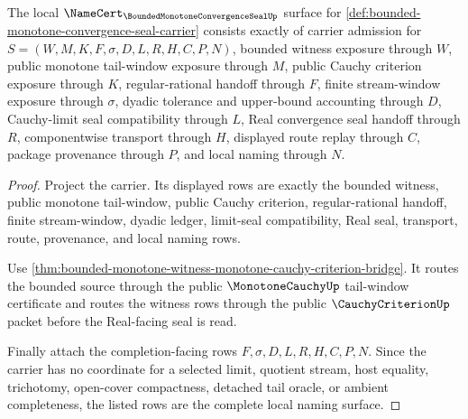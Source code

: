 \begin{theorem}
\label{thm:bounded-monotone-convergence-seal-namecert-obligations}
The local $\NameCert_{\BoundedMonotoneConvergenceSealUp}$ surface for \autoref{def:bounded-monotone-convergence-seal-carrier} consists exactly of carrier admission for $S=(W,M,K,F,\sigma,D,L,R,H,C,P,N)$, bounded witness exposure through $W$, public monotone tail-window exposure through $M$, public Cauchy criterion exposure through $K$, regular-rational handoff through $F$, finite stream-window exposure through $\sigma$, dyadic tolerance and upper-bound accounting through $D$, Cauchy-limit seal compatibility through $L$, Real convergence seal handoff through $R$, componentwise transport through $H$, displayed route replay through $C$, package provenance through $P$, and local naming through $N$.
\end{theorem}
\begin{proof}
Project the carrier. Its displayed rows are exactly the bounded witness, public monotone tail-window, public Cauchy criterion, regular-rational handoff, finite stream-window, dyadic ledger, limit-seal compatibility, Real seal, transport, route, provenance, and local naming rows.

Use \autoref{thm:bounded-monotone-witness-monotone-cauchy-criterion-bridge}. It routes the bounded source through the public $\MonotoneCauchyUp$ tail-window certificate and routes the witness rows through the public $\CauchyCriterionUp$ packet before the Real-facing seal is read.

Finally attach the completion-facing rows $F,\sigma,D,L,R,H,C,P,N$. Since the carrier has no coordinate for a selected limit, quotient stream, host equality, trichotomy, open-cover compactness, detached tail oracle, or ambient completeness, the listed rows are the complete local naming surface.
\end{proof}

